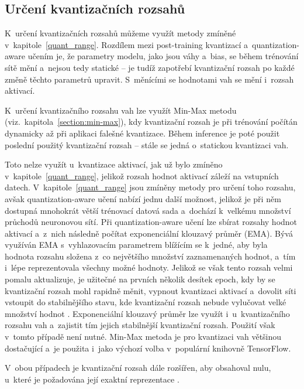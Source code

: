 \subsection{Určení kvantizačních rozsahů}

K~určení kvantizačních rozsahů můžeme využít metody zmíněné v~kapitole~\ref{quant_range}. Rozdílem mezi post-training kvantizací a~quantization-aware učením je, že parametry modelu, jako jsou váhy a~bias, se během trénování sítě mění a~nejsou tedy statické -- je tudíž zapotřebí kvantizační rozsah po každé změně těchto parametrů upravit. S~měnícími se hodnotami vah se mění i~rozsah aktivací. 

K~určení kvantizačního rozsahu vah lze využít Min-Max metodu (viz.~kapitola~\ref{section:min-max}), kdy kvantizační  rozsah je při trénování počítán dynamicky až při aplikaci falešné kvantizace. Během inference je poté použit poslední použitý kvantizační rozsah -- stále se jedná o~statickou kvantizaci vah.

Toto nelze využít u~kvantizace aktivací, jak už bylo zmíněno v~kapitole~\ref{quant_range}, jelikož rozsah hodnot aktivací záleží na vstupních datech. V~kapitole~\ref{quant_range} jsou zmíněny metody pro určení toho rozsahu, avšak quantization-aware učení nabízí jednu další možnost, jelikož je při něm dostupná mnohokrát větší trénovací datová sada a~dochází k~velkému množství průchodů neuronovou sítí. Při quantization-aware učení lze sbírat rozsahy hodnot aktivací a~z~nich následně počítat exponenciální klouzavý průměr (EMA). Bývá využíván EMA s~vyhlazovacím parametrem blížícím se k~jedné, aby byla hodnota rozsahu složena z~co největšího množství zaznamenaných hodnot, a~tím i~lépe reprezentovala všechny možné hodnoty. Jelikož se však tento rozsah velmi pomalu aktualizuje, je užitečné na prvních několik desítek epoch, kdy by se kvantizační rozsah mohl rapidně měnit, vypnout kvantizaci aktivací a~dovolit síti vstoupit do stabilnějšího stavu, kde kvantizační rozsah nebude vylučovat velké množství hodnot \cite{https://doi.org/10.48550/arxiv.1712.05877}. 
Exponenciální klouzavý průměr lze využít i~u~kvantizačního rozsahu vah a~zajistit tím jejich stabilnější kvantizační rozsah. Použití však v~tomto případě není nutné. Min-Max metoda je pro kvantizaci vah většinou dostačující a~je použita i~jako výchozí volba v~populární knihovně TensorFlow.

V~obou případech je kvantizační rozsah dále rozšířen, aby obsahoval nulu, u~které je požadována její exaktní reprezentace \cite{https://doi.org/10.48550/arxiv.1712.05877}.

